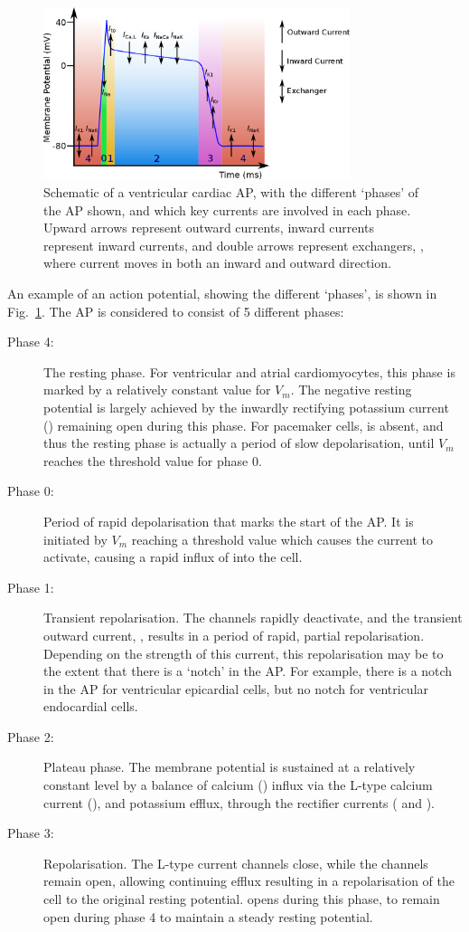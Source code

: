 \documentclass[../thesis-main.tex]{subfiles}
\begin{document}
 \begin{figure}
  \centering
  \includegraphics[width=0.8\textwidth]{ap-structure-full}
  \caption[Schematic of a cardiac AP]{Schematic of a ventricular cardiac AP, with the different `phases' of the AP shown, and which key currents are involved in each phase. Upward arrows represent outward currents, inward currents represent inward currents, and double arrows represent exchangers, \idest, where current moves in both an inward and outward direction.}
  \label{fig:ap-structure}
 \end{figure}
 An example of an action potential, showing the different `phases', is shown in Fig.~\ref{fig:ap-structure}. The AP is considered to consist of 5 different phases:
 \begin{description}
  \item[Phase 4:] The resting phase. For ventricular and atrial cardiomyocytes, this phase is marked by a relatively constant value for $V_m$. The negative resting potential is largely achieved by the inwardly rectifying potassium current (\ikix{}) remaining open during this phase. For pacemaker cells, \ikix{} is absent, and thus the resting phase is actually a period of slow depolarisation, until $V_m$ reaches the threshold value for phase 0.
  \item[Phase 0:] Period of rapid depolarisation that marks the start of the AP. It is initiated by $V_m$ reaching a threshold value which causes the \ina{} current to activate, causing a rapid influx of \na{} into the cell.
  \item[Phase 1:] Transient repolarisation. The \na{} channels rapidly deactivate, and the transient outward current, \ito{}, results in a period of rapid, partial repolarisation. Depending on the strength of this current, this repolarisation may be to the extent that there is a `notch' in the AP. For example, there is a notch in the AP for ventricular epicardial cells, but no notch for ventricular endocardial cells.
  \item[Phase 2:] Plateau phase. The membrane potential is sustained at a relatively constant level by a balance of calcium (\ca{}) influx via the L-type calcium current (\ica{}), and potassium efflux, through the rectifier \K{} currents (\ikr{} and \iks{}).
  \item[Phase 3:] Repolarisation. The L-type \ca{} current channels close, while the \iks{} channels remain open, allowing continuing \K{} efflux resulting in a repolarisation of the cell to the original resting potential. \ikix{} opens during this phase, to remain open during phase 4 to maintain a steady resting potential. 
 \end{description}
\end{document}
